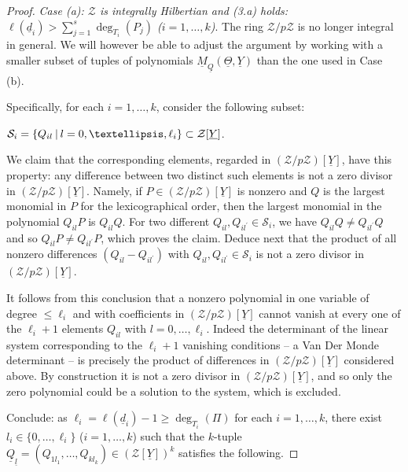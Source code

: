 \documentclass[10pt,a4paper]{amsart}
\begin{document}
\begin{proof}
\noindent
\emph{Case {\rm (a)}: ${\mathcal Z}$ is  integrally Hilbertian and \hbox{\rm (3.a)} holds: $\ell({\underline d}_i) > \sum_{j=1}^s \deg_{T_i}(P_j)$ ($i=1,\ldots,k$)}. The ring ${\mathcal Z}/p{\mathcal Z}$ is no longer integral in general. We will however be able to adjust the argument by working with a smaller subset of tuples of polynomials $\underline M_{\underline Q}(\underline{\Theta},\underline Y)$
than the one used in Case (b).

Specifically, for each $i=1,\ldots,k$, consider the following subset:
\vskip 1mm

\centerline{${\mathcal S}_i=\{ Q_{il} \hskip 2pt | \hskip 2pt  l=0,\ldots,\ell_i\} \subset {\mathcal Z}[\underline Y]$.}

\vskip 1mm

\noindent
We claim that the corresponding elements, regarded in $({\mathcal Z}/p{\mathcal Z})[\underline Y]$, have this property: any difference between two distinct such elements is not a zero divisor in $({\mathcal Z}/p{\mathcal Z})[\underline Y]$. Namely, if $P\in ({\mathcal Z}/p{\mathcal Z})[\underline Y]$ is nonzero and $Q$ is the largest monomial in $P$ for the lexicographical order, then the largest monomial in  the polynomial $Q_{il} P$ is $Q_{il} Q$. For two different $Q_{il}, Q_{i l^\prime} \in {\mathcal S}_i$, we have $Q_{il} Q\not= Q_{i l^\prime} Q$ and so $Q_{il} P\not= Q_{i l^\prime} P$, which proves the claim. Deduce next that the product of all nonzero differences $(Q_{il}- Q_{i l^\prime})$ with $Q_{il}, Q_{i l^\prime} \in {\mathcal S}_i$ is not a zero divisor in $({\mathcal Z}/p{\mathcal Z})[\underline Y]$.


 It follows from this conclusion that a nonzero polynomial in one variable of degree $\leq \ell_i$ and with coefficients in $({\mathcal Z}/p{\mathcal Z})[\underline Y]$ cannot vanish at every one of the $\ell_i+1$ elements $Q_{il}$ with $ l=0,\ldots,\ell_i$. Indeed the determinant of the linear system corresponding to the $\ell_i+1$ vanishing conditions -- a Van Der Monde determinant -- is precisely the product of differences in $({\mathcal Z}/p{\mathcal Z})[\underline Y]$ considered above. By construction it is not a zero divisor in $({\mathcal Z}/p{\mathcal Z})[\underline Y]$, and so only the zero polynomial could be a  solution to the system, which is excluded.

 
Conclude: as $\ell_i=\ell(\underline d_i) - 1 \geq \deg_{T_i}(\Pi)$ for each $i=1,\ldots,k$, there exist $l_i\in \{0,\ldots,\ell_i\}$ ($i=1,\ldots,k$) such that the $k$-tuple $\underline Q_{\underline l}=(Q_{1l_1},\ldots,Q_{kl_k}) \in ({\mathcal Z}[\underline Y])^k$ satisfies the following.
\vskip 1mm


\end{proof}
\end{document}
